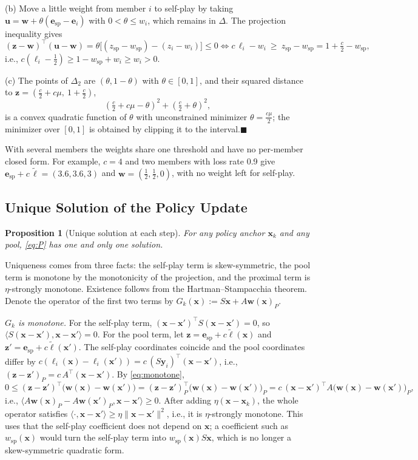 \documentclass{article} %
\theoremstyle{plain}
\newtheorem{proposition}[theorem]{Proposition}
\theoremstyle{remark}
\newcommand{\simplex}{\Delta}
\newcommand{\bx}{{\bm{x}}}
\newcommand{\by}{{\bm{y}}}
\newcommand{\bw}{{\bm{w}}}
\newcommand{\bz}{{\bm{z}}}
\newcommand{\bu}{{\bm{u}}}
\newcommand{\be}{{\bm{e}}}
\newcommand{\bell}{{\bm{\ell}}}
\newcommand{\aug}{\tilde{\bell}}
\newcommand{\esp}{\be_{\mathrm{sp}}}
\newcommand{\wsp}{w_{\mathrm{sp}}}
\begin{document}
(b) Move a little weight from member $i$ to self-play by taking $\bu=\bw+\theta(\esp-\be_i)$ with $0<\theta\le w_i$, which remains in $\simplex$. The projection inequality gives
\[
(\bz-\bw)^\top(\bu-\bw)=\theta\big[(z_{\mathrm{sp}}-\wsp)-(z_i-w_i)\big]\le0
\iff c\,\ell_i-w_i\ \ge\ z_{\mathrm{sp}}-\wsp=1+\tfrac c2-\wsp ,
\]
i.e., $c(\ell_i-\tfrac12)\ge1-\wsp+w_i\ge w_i>0$.

(c) The points of $\simplex_2$ are $(\theta,1-\theta)$ with $\theta\in[0,1]$, and their squared distance to $\bz=(\tfrac c2+c\mu,\ 1+\tfrac c2)$,
\[
(\tfrac c2+c\mu-\theta)^2+(\tfrac c2+\theta)^2 ,
\]
is a convex quadratic function of $\theta$ with unconstrained minimizer $\theta=\tfrac{c\mu}2$; the minimizer over $[0,1]$ is obtained by clipping it to the interval.\hfill$\blacksquare$

With several members the weights share one threshold and have no per-member closed form. For example, $c=4$ and two members with loss rate 0.9 give $\esp+c\,\aug=(3.6,3.6,3)$ and $\bw=(\tfrac12,\tfrac12,0)$, with no weight left for self-play.

\subsection{Unique Solution of the Policy Update}
\label{app:unique}

\begin{proposition}[Unique solution at each step]
\label{prop:unique}
For any policy anchor $\bx_k$ and any pool, \eqref{eq:P} has one and only one solution.
\end{proposition}
Uniqueness comes from three facts: the self-play term is skew-symmetric, the pool term is monotone by the monotonicity of the projection, and the proximal term is $\eta$-strongly monotone. Existence follows from the Hartman--Stampacchia theorem. Denote the operator of the first two terms by $G_k(\bx):=S\bx+A\bw(\bx)_P$.

\textit{$G_k$ is monotone.} For the self-play term, $(\bx-\bx')^\top S(\bx-\bx')=0$, so $\langle S(\bx-\bx'),\bx-\bx'\rangle=0$. For the pool term, let $\bz=\esp+c\aug(\bx)$ and $\bz'=\esp+c\aug(\bx')$. The self-play coordinates coincide and the pool coordinates differ by $c(\ell_i(\bx)-\ell_i(\bx'))=c\,(S\by_i)^\top(\bx-\bx')$, i.e., $(\bz-\bz')_P=c\,A^\top(\bx-\bx')$. By \eqref{eq:monotone},
\[
0\le(\bz-\bz')^\top\big(\bw(\bx)-\bw(\bx')\big)=(\bz-\bz')_P^\top\big(\bw(\bx)-\bw(\bx')\big)_P=c\,(\bx-\bx')^\top A\big(\bw(\bx)-\bw(\bx')\big)_P ,
\]
i.e., $\langle A\bw(\bx)_P-A\bw(\bx')_P,\bx-\bx'\rangle\ge0$. After adding $\eta(\bx-\bx_k)$, the whole operator satisfies $\langle\cdot,\bx-\bx'\rangle\ge\eta\|\bx-\bx'\|^2$, i.e., it is $\eta$-strongly monotone. This uses that the self-play coefficient does not depend on $\bx$; a coefficient such as $\wsp(\bx)$ would turn the self-play term into $\wsp(\bx)S\bx$, which is no longer a skew-symmetric quadratic form.
\end{document}

